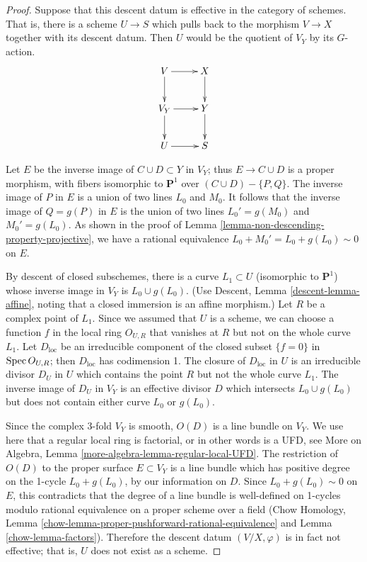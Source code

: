 \begin{proof}
\medskip\noindent
Suppose that this descent datum is effective in the category
of schemes. That is, there is a scheme $U\to S$
which pulls back to the morphism $V\to X$ together
with its descent datum. Then $U$ would be the quotient
of $V_Y$ by its $G$-action.
$$
\xymatrix{
V \ar[r]\ar[d]&  X\ar[d] \\
V_Y \ar[r]\ar[d]& Y\ar[d] \\
U \ar[r]& S
}
$$

\medskip\noindent
Let $E$ be the inverse image of $C\cup D\subset Y$ in $V_Y$;
thus $E\rightarrow C\cup D$ is a proper morphism, with fibers
isomorphic to ${\mathbf P}^1$ over $(C\cup D)-\{P,Q\}$.
The inverse image of $P$ in $E$ is a union of two lines $L_0$
and $M_0$. It follows that the inverse image of $Q=g(P)$ in $E$
is the union of two lines $L_0'=g(M_0)$ and $M_0'=g(L_0)$.
As shown in the proof
of Lemma \ref{lemma-non-descending-property-projective},
we have a rational equivalence $L_0+M_0'=L_0+g(L_0)\sim 0$ on $E$.

\medskip\noindent
By descent of closed subschemes, there is a curve $L_1\subset U$
(isomorphic to ${\mathbf P}^1$)
whose inverse image in $V_Y$ is $L_0\cup g(L_0)$. (Use Descent, Lemma
\ref{descent-lemma-affine}, noting that a closed immersion is an affine
morphism.)
Let $R$ be a complex point of $L_1$. Since
we assumed that $U$ is a scheme, we can choose a function
$f$ in the local ring $O_{U,R}$ that vanishes at $R$ but not
on the whole curve $L_1$. Let $D_{\text{loc}}$ be an irreducible component
of the closed subset $\{f = 0\}$ in $\mathop{\mathrm{Spec}} O_{U,R}$; then
$D_{\text{loc}}$ has codimension 1.
The closure of $D_{\text{loc}}$ in $U$ is an irreducible divisor $D_U$
in $U$ which contains the point $R$ but not the whole curve $L_1$.
The inverse image of $D_U$ in $V_Y$ is an effective divisor $D$
which intersects $L_0\cup g(L_0)$ but does not contain either
curve $L_0$ or $g(L_0)$.

\medskip\noindent
Since the complex 3-fold $V_Y$ is smooth, $O(D)$ is a line
bundle on $V_Y$. We use here that a regular local ring is factorial,
or in other words is a UFD, see
More on Algebra, Lemma \ref{more-algebra-lemma-regular-local-UFD}.
The restriction of $O(D)$ to the proper surface
$E\subset V_Y$ is a line bundle which has positive degree on the 1-cycle
$L_0+g(L_0)$, by our information on $D$. Since
$L_0+g(L_0)\sim 0$ on $E$, this contradicts 
that the degree of a line bundle is well-defined
on 1-cycles modulo rational equivalence on a proper scheme
over a field (Chow Homology,
Lemma \ref{chow-lemma-proper-pushforward-rational-equivalence}
and Lemma \ref{chow-lemma-factors}). Therefore the descent datum
$(V/X,\varphi)$ is in fact not effective; that is, $U$ does not exist
as a scheme.
\end{proof}

